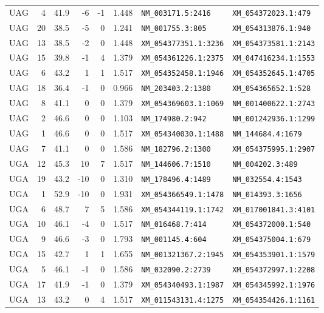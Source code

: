 \begin{center}
\begin{tabular}{l r r r r r l l}
$\mathrm{UAG}$ & 4 & 41.9 & -6 & -1 & 1.448 & \texttt{NM\_003171.5:2416} & \texttt{XM\_054372023.1:479} \\
$\mathrm{UAG}$ & 20 & 38.5 & -5 & 0 & 1.241 & \texttt{NM\_001755.3:805} & \texttt{XM\_054313876.1:940} \\
$\mathrm{UAG}$ & 13 & 38.5 & -2 & 0 & 1.448 & \texttt{XM\_054377351.1:3236} & \texttt{XM\_054373581.1:2143} \\
$\mathrm{UAG}$ & 15 & 39.8 & -1 & 4 & 1.379 & \texttt{XM\_054361226.1:2375} & \texttt{XM\_047416234.1:1553} \\
$\mathrm{UAG}$ & 6 & 43.2 & 1 & 1 & 1.517 & \texttt{XM\_054352458.1:1946} & \texttt{XM\_054352645.1:4705} \\
$\mathrm{UAG}$ & 18 & 36.4 & -1 & 0 & 0.966 & \texttt{NM\_203403.2:1380} & \texttt{XM\_054365652.1:528} \\
$\mathrm{UAG}$ & 8 & 41.1 & 0 & 0 & 1.379 & \texttt{XM\_054369603.1:1069} & \texttt{NM\_001400622.1:2743} \\
$\mathrm{UAG}$ & 2 & 46.6 & 0 & 0 & 1.103 & \texttt{NM\_174980.2:942} & \texttt{NM\_001242936.1:1299} \\
$\mathrm{UAG}$ & 1 & 46.6 & 0 & 0 & 1.517 & \texttt{XM\_054340030.1:1488} & \texttt{NM\_144684.4:1679} \\
$\mathrm{UAG}$ & 7 & 41.1 & 0 & 0 & 1.586 & \texttt{NM\_182796.2:1300} & \texttt{XM\_054375995.1:2907} \\
$\mathrm{UGA}$ & 12 & 45.3 & 10 & 7 & 1.517 & \texttt{NM\_144606.7:1510} & \texttt{NM\_004202.3:489} \\
$\mathrm{UGA}$ & 19 & 43.2 & -10 & 0 & 1.310 & \texttt{NM\_178496.4:1489} & \texttt{NM\_032554.4:1543} \\
$\mathrm{UGA}$ & 1 & 52.9 & -10 & 0 & 1.931 & \texttt{XM\_054366549.1:1478} & \texttt{NM\_014393.3:1656} \\
$\mathrm{UGA}$ & 6 & 48.7 & 7 & 5 & 1.586 & \texttt{XM\_054344119.1:1742} & \texttt{XM\_017001841.3:4101} \\
$\mathrm{UGA}$ & 10 & 46.1 & -4 & 0 & 1.517 & \texttt{NM\_016468.7:414} & \texttt{XM\_054372000.1:540} \\
$\mathrm{UGA}$ & 9 & 46.6 & -3 & 0 & 1.793 & \texttt{NM\_001145.4:604} & \texttt{XM\_054375004.1:679} \\
$\mathrm{UGA}$ & 15 & 42.7 & 1 & 1 & 1.655 & \texttt{NM\_001321367.2:1945} & \texttt{XM\_054353901.1:1579} \\
$\mathrm{UGA}$ & 5 & 46.1 & -1 & 0 & 1.586 & \texttt{NM\_032090.2:2739} & \texttt{XM\_054372997.1:2208} \\
$\mathrm{UGA}$ & 17 & 41.9 & -1 & 0 & 1.379 & \texttt{XM\_054340493.1:1987} & \texttt{XM\_054345992.1:1976} \\
$\mathrm{UGA}$ & 13 & 43.2 & 0 & 4 & 1.517 & \texttt{XM\_011543131.4:1275} & \texttt{XM\_054354426.1:1161} \\
\bottomrule
\end{tabular}
\end{center}

